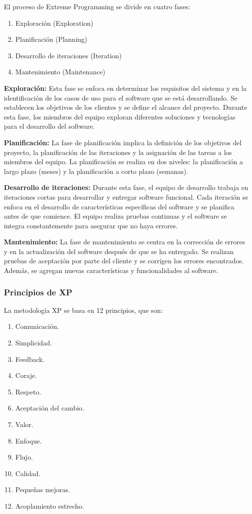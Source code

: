 \documentclass[executivepaper]{article}
\begin{document}
El proceso de Extreme Programming se divide en cuatro fases:

\begin{enumerate}
\item Exploración (Exploration)
\item Planificación (Planning)
\item Desarrollo de iteraciones (Iteration)
\item Mantenimiento (Maintenance)
\end{enumerate}

\textbf{Exploración:} Esta fase se enfoca en determinar los requisitos del sistema y en la identificación de los casos de uso para el software que se está desarrollando. Se establecen los objetivos de los clientes y se define el alcance del proyecto. Durante esta fase, los miembros del equipo exploran diferentes soluciones y tecnologías para el desarrollo del software.

\textbf{Planificación:} La fase de planificación implica la definición de los objetivos del proyecto, la planificación de las iteraciones y la asignación de las tareas a los miembros del equipo. La planificación se realiza en dos niveles: la planificación a largo plazo (meses) y la planificación a corto plazo (semanas).

\textbf{Desarrollo de iteraciones:} Durante esta fase, el equipo de desarrollo trabaja en iteraciones cortas para desarrollar y entregar software funcional. Cada iteración se enfoca en el desarrollo de características específicas del software y se planifica antes de que comience. El equipo realiza pruebas continuas y el software se integra constantemente para asegurar que no haya errores.

\textbf{Mantenimiento:} La fase de mantenimiento se centra en la corrección de errores y en la actualización del software después de que se ha entregado. Se realizan pruebas de aceptación por parte del cliente y se corrigen los errores encontrados. Además, se agregan nuevas características y funcionalidades al software.

\subsubsection*{Principios de XP}

La metodología XP se basa en 12 principios, que son:

\begin{enumerate}
\item Comunicación.
\item Simplicidad.
\item Feedback.
\item Coraje.
\item Respeto.
\item Aceptación del cambio.
\item Valor.
\item Enfoque.
\item Flujo.
\item Calidad.
\item Pequeñas mejoras.
\item Acoplamiento estrecho.
\end{enumerate}
\end{document}
